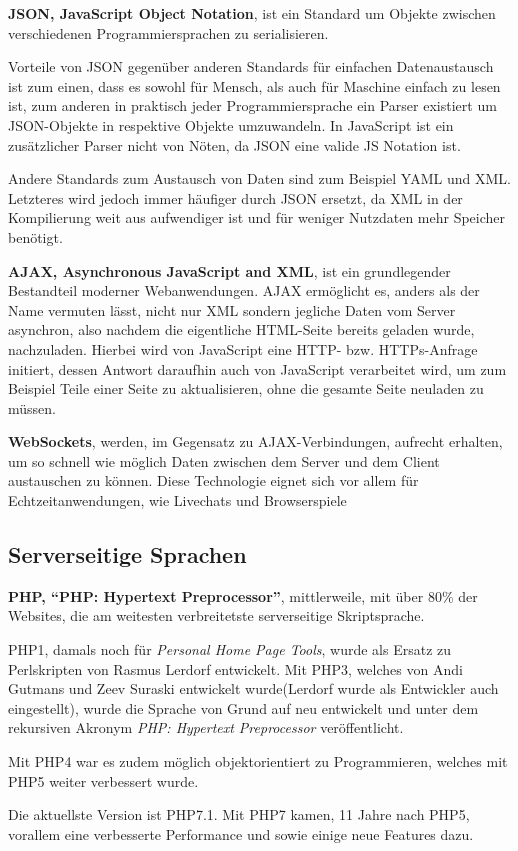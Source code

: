 \documentclass[a4paper,12pt,ngerman]{scrartcl}      %
\let\oldcite\cite
\renewcommand{\cite}[1]{\textsuperscript{\oldcite{#1}}}
\newcommand{\spacer}{\par\bigskip\noindent}
\begin{document}
	\spacer\textbf{JSON, JavaScript Object Notation}, ist ein Standard um Objekte zwischen verschiedenen Programmiersprachen zu serialisieren.\par
	Vorteile von JSON gegenüber anderen Standards für einfachen Datenaustausch ist zum einen, dass es sowohl für Mensch, als auch für Maschine einfach zu lesen ist, zum anderen in praktisch jeder Programmiersprache ein Parser existiert um JSON-Objekte in respektive Objekte umzuwandeln. In JavaScript ist ein zusätzlicher Parser nicht von Nöten, da JSON eine valide JS Notation ist.\cite{json}\par
	Andere Standards zum Austausch von Daten sind zum Beispiel YAML und XML. Letzteres wird jedoch immer häufiger durch JSON ersetzt, da XML in der Kompilierung weit aus aufwendiger ist und für weniger Nutzdaten mehr Speicher benötigt.\par
	
	\spacer\textbf{AJAX, Asynchronous JavaScript and XML}, ist ein grundlegender Bestandteil moderner Webanwendungen. AJAX ermöglicht es, anders als der Name vermuten lässt, nicht nur XML sondern jegliche Daten vom Server asynchron, also nachdem die eigentliche HTML-Seite bereits geladen wurde, nachzuladen. Hierbei wird von JavaScript eine HTTP- bzw. HTTPs-Anfrage initiert, dessen Antwort daraufhin auch von JavaScript verarbeitet wird, um zum Beispiel Teile einer Seite zu aktualisieren, ohne die gesamte Seite neuladen zu müssen.\cite{ajaxWiki}\par
	
	\spacer\textbf{WebSockets}, werden, im Gegensatz zu AJAX-Verbindungen, aufrecht erhalten, um so schnell wie möglich Daten zwischen dem Server und dem Client austauschen zu können. Diese Technologie eignet sich vor allem für Echtzeitanwendungen, wie Livechats und Browserspiele\cite{websocketWiki}\par
	
	\subsection{Serverseitige Sprachen}
	
	\spacer\textbf{PHP, ``PHP: Hypertext Preprocessor''}, mittlerweile, mit über 80\% der Websites, die am weitesten verbreitetste serverseitige Skriptsprache.\cite{phpCoverage}\par
	PHP1, damals noch für \emph{Personal Home Page Tools}, wurde als Ersatz zu Perlskripten von Rasmus Lerdorf entwickelt. Mit PHP3, welches von Andi Gutmans und Zeev Suraski entwickelt wurde(Lerdorf wurde als Entwickler auch eingestellt), wurde die Sprache von Grund auf neu entwickelt und unter dem rekursiven Akronym \emph{PHP: Hypertext Preprocessor} veröffentlicht.\par
	Mit PHP4 war es zudem möglich objektorientiert zu Programmieren, welches mit PHP5 weiter verbessert wurde.\par
	Die aktuellste Version ist PHP7.1. Mit PHP7 kamen, 11 Jahre nach PHP5, vorallem eine verbesserte Performance und sowie einige neue Features dazu.\cite{phpWiki}\par
	
\end{document}

